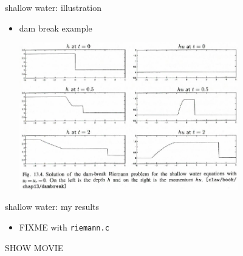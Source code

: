 \documentclass[10pt,hyperref]{beamer}
\begin{document}
\begin{frame}{shallow water: illustration}

\begin{itemize}
\item dam break example

\hfill \includegraphics[width=0.75\textwidth]{figs/leveque13p4}

\end{itemize}
\end{frame}


\begin{frame}{shallow water: my results}

\begin{itemize}
\item FIXME with \texttt{riemann.c}
\end{itemize}

\vspace{10mm}
\begin{center}
\alert{SHOW MOVIE}
\end{center}
\end{frame}
\end{document}

